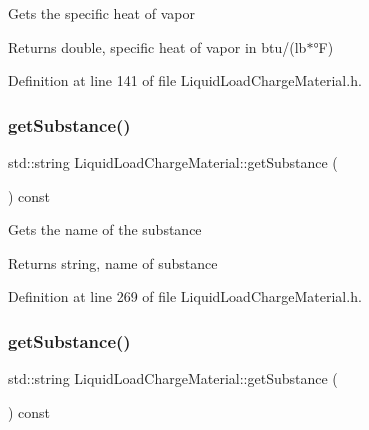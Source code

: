 Gets the specific heat of vapor \begin{DoxyReturn}{Returns}
double, specific heat of vapor in btu/(lb$\ast$°F) 
\end{DoxyReturn}


Definition at line 141 of file Liquid\+Load\+Charge\+Material.\+h.

\mbox{\label{class_liquid_load_charge_material_a8f925c04c15ed889ba3fd7c4b628dbff}} 
\subsubsection{\texorpdfstring{get\+Substance()}{getSubstance()}\hspace{0.1cm}{\footnotesize\ttfamily [1/3]}}
{\footnotesize\ttfamily std\+::string Liquid\+Load\+Charge\+Material\+::get\+Substance (\begin{DoxyParamCaption}{ }\end{DoxyParamCaption}) const\hspace{0.3cm}{\ttfamily [inline]}}

Gets the name of the substance \begin{DoxyReturn}{Returns}
string, name of substance 
\end{DoxyReturn}


Definition at line 269 of file Liquid\+Load\+Charge\+Material.\+h.

\mbox{\label{class_liquid_load_charge_material_a8f925c04c15ed889ba3fd7c4b628dbff}} 
\subsubsection{\texorpdfstring{get\+Substance()}{getSubstance()}\hspace{0.1cm}{\footnotesize\ttfamily [2/3]}}
{\footnotesize\ttfamily std\+::string Liquid\+Load\+Charge\+Material\+::get\+Substance (\begin{DoxyParamCaption}{ }\end{DoxyParamCaption}) const\hspace{0.3cm}{\ttfamily [inline]}}

